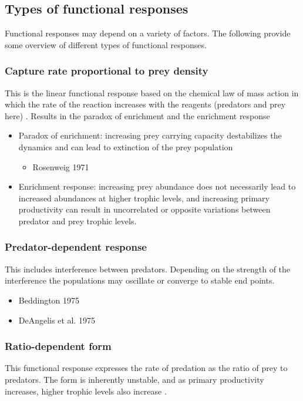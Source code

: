\documentclass[12pt, a4paper]{article}
\begin{document}
\subsection{Types of functional responses}
Functional responses may depend on a variety of factors. The following provide some overview of different types of functional responses.  



\subsubsection{Capture rate proportional to prey density}
This is the linear functional response based on the chemical law of mass action in which the rate of the reaction increases with the reagents (predators and prey here) \citep{Anderson2010}. Results in the paradox of enrichment and the enrichment response
\begin{itemize}
\item Paradox of enrichment: increasing prey carrying capacity destabilizes the dynamics and can lead to extinction of the prey population 
\begin{itemize}
\item Rosenweig 1971
\end{itemize}
\item Enrichment response: increasing prey abundance does not necessarily lead to increased abundances at higher trophic levels, and increasing primary productivity can result in uncorrelated or opposite variations between predator and prey trophic levels. 
\end{itemize}

\subsubsection{Predator-dependent response}
This includes interference between predators. Depending on the strength of the interference the populations may oscillate or converge to stable end points. 
\begin{itemize}
\item Beddington 1975
\item DeAngelis et al. 1975
\end{itemize}

\subsubsection{Ratio-dependent form}
This functional response expresses the rate of predation as the ratio of prey to predators. The form is inherently unstable, and as primary productivity increases, higher trophic levels also increase \citep{Anderson2010}.
\end{document}
